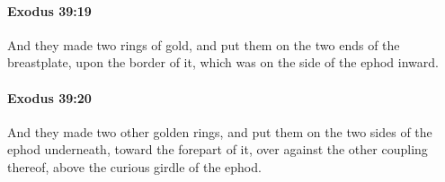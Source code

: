 		\paragraph{Exodus 39:19} %
			\label{EXODUS-39-19}

			And they made two rings of gold, and put them on the two ends of the breastplate, upon the border of it, which was on the side of the ephod inward.


		\paragraph{Exodus 39:20} %
			\label{EXODUS-39-20}

			And they made two other golden rings, and put them on the two sides of the ephod underneath, toward the forepart of it, over against the other coupling thereof, above the curious girdle of the ephod.


